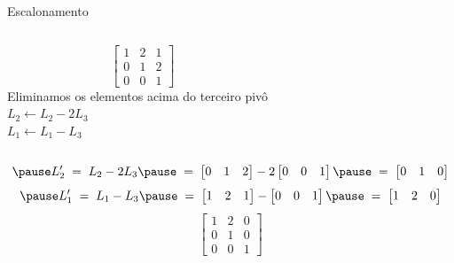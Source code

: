 \begin{resolution}{Escalonamento}
\begin{columns}
  \[\;\;\;
  \begin{bmatrix}
    1 & 2 & 1 \\
    0 & 1 & 2 \\
    0 & 0 & 1
  \end{bmatrix}
  \]
  \pause
{}
  Eliminamos os elementos acima do terceiro pivô
  \\ \pause
  \(
    L_2 \leftarrow L_2 - 2 L_3
  \)
  \\ \pause
  \(
    L_1 \leftarrow L_1 - L_3
  \)
\end{columns}
\vspace{-\baselineskip}
\[
  \pause
  L'_2
  \;=\;
  L_2 - 2 L_3
  \pause
  \;=\;
  \begin{bmatrix}
    0 & 1 & 2
  \end{bmatrix}
  - 2
  \begin{bmatrix}
    0 & 0 & 1
  \end{bmatrix}
  \pause
  \;=\;
  \begin{bmatrix}
    0 & 1 & 0
  \end{bmatrix}
\]
\[
  \pause
  L'_1
  \;=\;
  L_1 - L_3
  \pause
  \;=\;
  \begin{bmatrix}
    1 & 2 & 1
  \end{bmatrix}
  -
  \begin{bmatrix}
    0 & 0 & 1
  \end{bmatrix}
  \pause
  \;=\;
  \begin{bmatrix}
    1 & 2 & 0
  \end{bmatrix}
\]
\pause
\[
  \begin{bmatrix}
    1 & 2 & 0 \\
    0 & 1 & 0 \\
    0 & 0 & 1
  \end{bmatrix}
\]
\end{resolution}

